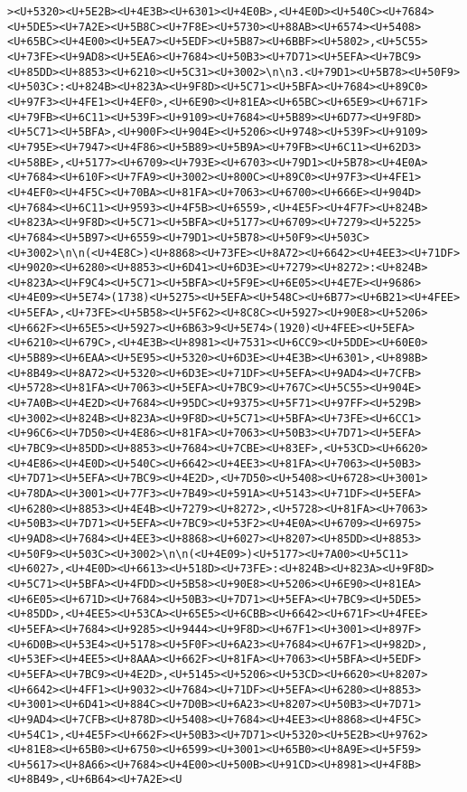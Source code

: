 \documentclass[
]{article}
\begin{document}
\begin{verbatim}
><U+5320><U+5E2B><U+4E3B><U+6301><U+4E0B>,<U+4E0D><U+540C><U+7684><U+5DE5><U+7A2E><U+5B8C><U+7F8E><U+5730><U+88AB><U+6574><U+5408><U+65BC><U+4E00><U+5EA7><U+5EDF><U+5B87><U+6BBF><U+5802>,<U+5C55><U+73FE><U+9AD8><U+5EA6><U+7684><U+50B3><U+7D71><U+5EFA><U+7BC9><U+85DD><U+8853><U+6210><U+5C31><U+3002>\n\n3.<U+79D1><U+5B78><U+50F9><U+503C>:<U+824B><U+823A><U+9F8D><U+5C71><U+5BFA><U+7684><U+89C0><U+97F3><U+4FE1><U+4EF0>,<U+6E90><U+81EA><U+65BC><U+65E9><U+671F><U+79FB><U+6C11><U+539F><U+9109><U+7684><U+5B89><U+6D77><U+9F8D><U+5C71><U+5BFA>,<U+900F><U+904E><U+5206><U+9748><U+539F><U+9109><U+795E><U+7947><U+4F86><U+5B89><U+5B9A><U+79FB><U+6C11><U+62D3><U+58BE>,<U+5177><U+6709><U+793E><U+6703><U+79D1><U+5B78><U+4E0A><U+7684><U+610F><U+7FA9><U+3002><U+800C><U+89C0><U+97F3><U+4FE1><U+4EF0><U+4F5C><U+70BA><U+81FA><U+7063><U+6700><U+666E><U+904D><U+7684><U+6C11><U+9593><U+4F5B><U+6559>,<U+4E5F><U+4F7F><U+824B><U+823A><U+9F8D><U+5C71><U+5BFA><U+5177><U+6709><U+7279><U+5225><U+7684><U+5B97><U+6559><U+79D1><U+5B78><U+50F9><U+503C><U+3002>\n\n(<U+4E8C>)<U+8868><U+73FE><U+8A72><U+6642><U+4EE3><U+71DF><U+9020><U+6280><U+8853><U+6D41><U+6D3E><U+7279><U+8272>:<U+824B><U+823A><U+F9C4><U+5C71><U+5BFA><U+5F9E><U+6E05><U+4E7E><U+9686><U+4E09><U+5E74>(1738)<U+5275><U+5EFA><U+548C><U+6B77><U+6B21><U+4FEE><U+5EFA>,<U+73FE><U+5B58><U+5F62><U+8C8C><U+5927><U+90E8><U+5206><U+662F><U+65E5><U+5927><U+6B63>9<U+5E74>(1920)<U+4FEE><U+5EFA><U+6210><U+679C>,<U+4E3B><U+8981><U+7531><U+6CC9><U+5DDE><U+60E0><U+5B89><U+6EAA><U+5E95><U+5320><U+6D3E><U+4E3B><U+6301>,<U+898B><U+8B49><U+8A72><U+5320><U+6D3E><U+71DF><U+5EFA><U+9AD4><U+7CFB><U+5728><U+81FA><U+7063><U+5EFA><U+7BC9><U+767C><U+5C55><U+904E><U+7A0B><U+4E2D><U+7684><U+95DC><U+9375><U+5F71><U+97FF><U+529B><U+3002><U+824B><U+823A><U+9F8D><U+5C71><U+5BFA><U+73FE><U+6CC1><U+96C6><U+7D50><U+4E86><U+81FA><U+7063><U+50B3><U+7D71><U+5EFA><U+7BC9><U+85DD><U+8853><U+7684><U+7CBE><U+83EF>,<U+53CD><U+6620><U+4E86><U+4E0D><U+540C><U+6642><U+4EE3><U+81FA><U+7063><U+50B3><U+7D71><U+5EFA><U+7BC9><U+4E2D>,<U+7D50><U+5408><U+6728><U+3001><U+78DA><U+3001><U+77F3><U+7B49><U+591A><U+5143><U+71DF><U+5EFA><U+6280><U+8853><U+4E4B><U+7279><U+8272>,<U+5728><U+81FA><U+7063><U+50B3><U+7D71><U+5EFA><U+7BC9><U+53F2><U+4E0A><U+6709><U+6975><U+9AD8><U+7684><U+4EE3><U+8868><U+6027><U+8207><U+85DD><U+8853><U+50F9><U+503C><U+3002>\n\n(<U+4E09>)<U+5177><U+7A00><U+5C11><U+6027>,<U+4E0D><U+6613><U+518D><U+73FE>:<U+824B><U+823A><U+9F8D><U+5C71><U+5BFA><U+4FDD><U+5B58><U+90E8><U+5206><U+6E90><U+81EA><U+6E05><U+671D><U+7684><U+50B3><U+7D71><U+5EFA><U+7BC9><U+5DE5><U+85DD>,<U+4EE5><U+53CA><U+65E5><U+6CBB><U+6642><U+671F><U+4FEE><U+5EFA><U+7684><U+9285><U+9444><U+9F8D><U+67F1><U+3001><U+897F><U+6D0B><U+53E4><U+5178><U+5F0F><U+6A23><U+7684><U+67F1><U+982D>,<U+53EF><U+4EE5><U+8AAA><U+662F><U+81FA><U+7063><U+5BFA><U+5EDF><U+5EFA><U+7BC9><U+4E2D>,<U+5145><U+5206><U+53CD><U+6620><U+8207><U+6642><U+4FF1><U+9032><U+7684><U+71DF><U+5EFA><U+6280><U+8853><U+3001><U+6D41><U+884C><U+7D0B><U+6A23><U+8207><U+50B3><U+7D71><U+9AD4><U+7CFB><U+878D><U+5408><U+7684><U+4EE3><U+8868><U+4F5C><U+54C1>,<U+4E5F><U+662F><U+50B3><U+7D71><U+5320><U+5E2B><U+9762><U+81E8><U+65B0><U+6750><U+6599><U+3001><U+65B0><U+8A9E><U+5F59><U+5617><U+8A66><U+7684><U+4E00><U+500B><U+91CD><U+8981><U+4F8B><U+8B49>,<U+6B64><U+7A2E><U
\end{verbatim}
\end{document}
